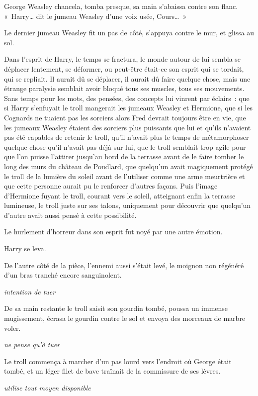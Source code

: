 George Weasley chancela, tomba presque, sa main s'abaissa contre son flanc. «~Harry… dit le jumeau Weasley d'une voix usée, Cours…~»

Le dernier jumeau Weasley fit un pas de côté, s'appuya contre le mur, et glissa au sol.

Dans l'esprit de Harry, le temps se fractura, le monde autour de lui sembla se déplacer lentement, se déformer, ou peut-être était-ce son esprit qui se tordait, qui se repliait. Il aurait dû se déplacer, il aurait dû faire quelque chose, mais une étrange paralysie semblait avoir bloqué tous ses muscles, tous ses mouvements. Sans temps pour les mots, des pensées, des concepts lui vinrent par éclairs~: que si Harry s'enfuyait le troll mangerait les jumeaux Weasley et Hermione, que si les Cognards ne tuaient pas les sorciers alors Fred devrait toujours être en vie, que les jumeaux Weasley étaient des sorciers plus puissants que lui et qu'ils n'avaient pas été capables de retenir le troll, qu'il n'avait plus le temps de métamorphoser quelque chose qu'il n'avait pas déjà sur lui, que le troll semblait trop agile pour que l'on puisse l'attirer jusqu'au bord de la terrasse avant de le faire tomber le long des murs du château de Poudlard, que quelqu'un avait magiquement protégé le troll de la lumière du soleil avant de l'utiliser comme une arme meurtrière et que cette personne aurait pu le renforcer d'autres façons. Puis l'image d'Hermione fuyant le troll, courant vers le soleil, atteignant enfin la terrasse lumineuse, le troll juste sur ses talons, uniquement pour découvrir que quelqu'un d'autre avait aussi pensé à cette possibilité.

Le hurlement d'horreur dans son esprit fut noyé par une autre émotion.

Harry se leva.

De l'autre côté de la pièce, l'ennemi aussi s'était levé, le moignon non régénéré d'un bras tranché encore sanguinolent.

\emph{intention de tuer}

De sa main restante le troll saisit son gourdin tombé, poussa un immense mugissement, écrasa le gourdin contre le sol et envoya des morceaux de marbre voler.

\emph{ne pense qu'à tuer}

Le troll commença à marcher d'un pas lourd vers l'endroit où George était tombé, et un léger filet de bave traînait de la commissure de ses lèvres.

\emph{utilise tout moyen disponible}

